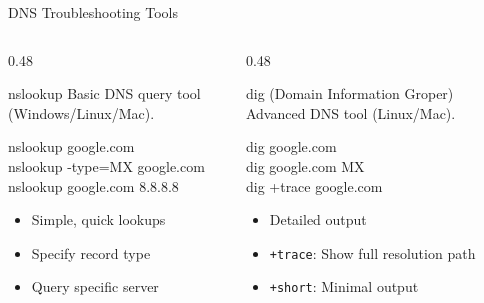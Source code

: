 \documentclass[aspectratio=169]{beamer}  %
\begin{document}
\begin{frame}{DNS Troubleshooting Tools}
    \begin{columns}[T]
        \begin{column}{0.48\textwidth}
            \begin{block}{nslookup}
                \small
                Basic DNS query tool (Windows/Linux/Mac).
                
                \vspace{0.2em}
                \ttfamily\footnotesize
                nslookup google.com \\
                nslookup -type=MX google.com \\
                nslookup google.com 8.8.8.8
                
                \vspace{0.2em}
                \normalfont\small
                \begin{itemize}\setlength{\itemsep}{1pt}
                    \item Simple, quick lookups
                    \item Specify record type
                    \item Query specific server
                \end{itemize}
            \end{block}
        \end{column}
        \begin{column}{0.48\textwidth}
            \begin{block}{dig (Domain Information Groper)}
                \small
                Advanced DNS tool (Linux/Mac).
                
                \vspace{0.2em}
                \ttfamily\footnotesize
                dig google.com \\
                dig google.com MX \\
                dig +trace google.com
                
                \vspace{0.2em}
                \normalfont\small
                \begin{itemize}\setlength{\itemsep}{1pt}
                    \item Detailed output
                    \item \texttt{+trace}: Show full resolution path
                    \item \texttt{+short}: Minimal output
                \end{itemize}
            \end{block}
        \end{column}
    \end{columns}
    

\end{frame}
\end{document}
